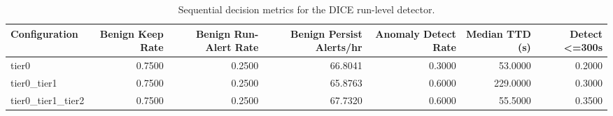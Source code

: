 \begin{table}[t]
\centering
\caption{Sequential decision metrics for the DICE run-level detector.}
\label{tab:dice_sequential_metrics}
\footnotesize
\begin{tabular}{lrrrrrr}
\toprule
Configuration & Benign Keep Rate & Benign Run-Alert Rate & Benign Persist Alerts/hr & Anomaly Detect Rate & Median TTD (s) & Detect <=300s \\
\midrule
tier0 & 0.7500 & 0.2500 & 66.8041 & 0.3000 & 53.0000 & 0.2000 \\
tier0_tier1 & 0.7500 & 0.2500 & 65.8763 & 0.6000 & 229.0000 & 0.3000 \\
tier0_tier1_tier2 & 0.7500 & 0.2500 & 67.7320 & 0.6000 & 55.5000 & 0.3500 \\
\bottomrule
\end{tabular}

\end{table}
